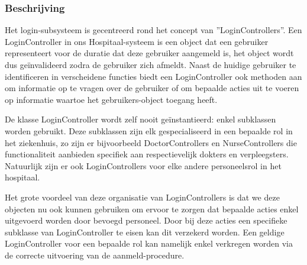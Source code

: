\documentclass[a4paper]{article}
\begin{document}
\subsubsection{Beschrijving}
Het login-subsysteem is gecentreerd rond het concept van ''LoginControllers''. Een LoginController in ons Hospitaal-systeem is een object dat een gebruiker representeert voor de duratie dat deze gebruiker aangemeld is, het object wordt dus ge\"invalideerd zodra de gebruiker zich afmeldt.
Naast de huidige gebruiker te identificeren in verscheidene functies biedt een LoginController ook methoden aan om informatie op te vragen over de gebruiker of om bepaalde acties uit te voeren op informatie waartoe het gebruikers-object toegang heeft.

De klasse LoginController wordt zelf nooit ge\"instantieerd: enkel subklassen worden gebruikt. Deze subklassen zijn elk gespecialiseerd in een bepaalde rol in het ziekenhuis, zo zijn er bijvoorbeeld DoctorControllers en NurseControllers die functionaliteit aanbieden specifiek aan respectievelijk dokters en verpleegsters. Natuurlijk zijn er ook LoginControllers voor elke andere personeelsrol in het hospitaal.

Het grote voordeel van deze organisatie van LoginControllers is dat we deze objecten nu ook kunnen gebruiken om ervoor te zorgen dat bepaalde acties enkel uitgevoerd worden door bevoegd personeel. Door bij deze acties een specifieke subklasse van LoginController te eisen kan dit verzekerd worden. Een geldige LoginController voor een bepaalde rol kan namelijk enkel verkregen worden via de correcte uitvoering van de aanmeld-procedure.
\end{document}
